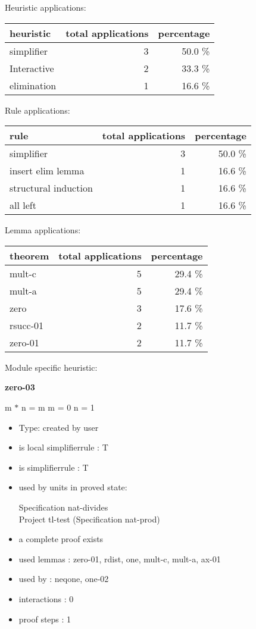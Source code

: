 \documentclass[a4paper]{article}
\begin{document}
\medskip


Heuristic applications:

\begin{supertabular}{l|r|r}
heuristic	& total applications & percentage \\ \hline
simplifier & 3 & 50.0 \% \\
Interactive & 2 & 33.3 \% \\
elimination & 1 & 16.6 \% \\

\end{supertabular}

Rule applications:

\begin{supertabular}{l|r|r}
rule	        & total applications & percentage \\ \hline
simplifier & 3 & 50.0 \% \\
insert elim lemma & 1 & 16.6 \% \\
structural induction & 1 & 16.6 \% \\
all left & 1 & 16.6 \% \\

\end{supertabular}

Lemma applications:

\begin{supertabular}{l|r|r}
theorem	        & total applications & percentage \\ \hline
mult-c & 5 & 29.4 \% \\
mult-a & 5 & 29.4 \% \\
zero & 3 & 17.6 \% \\
rsucc-01 & 2 & 11.7 \% \\
zero-01 & 2 & 11.7 \% \\

\end{supertabular}

Module specific heuristic:

\pagebreak

{\LARGE\bf zero-03}\label{lemma-zero-03}

\medskip

 \Fol m $*$ n = m \Equiv m = 0 \Or n = 1

\begin{itemize}

\item Type: created by user

\item is local simplifierrule : T
\item is simplifierrule : T
\item used by units in proved state:

Specification nat-divides \\
Project tl-test (Specification nat-prod)
\item       a complete proof exists
\item       used lemmas  : zero-01, rdist, one, mult-c, mult-a, ax-01
\item       used by      : neqone, one-02
\item       interactions : 0
\item       proof steps  : 1
\end{itemize}
\end{document}

